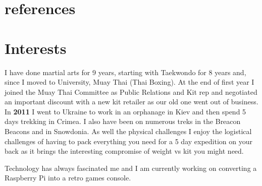 \documentclass[11pt,a4paper,sans]{moderncv} %
\begin{document}

\section{references}

\section{Interests}

{
	I have done martial arts for 9 years, starting with Taekwondo for 8 years and, since I moved to University,  Muay Thai (Thai Boxing). At the end of first year I joined the Muay Thai Committee as Public Relations and Kit rep and negotiated an important discount with a new kit retailer as our old one went out of business. 
}
{
	In \textbf{2011} I went to Ukraine to work in an orphanage in Kiev and then spend 5 days trekking in Crimea. I also have been on numerous treks in the Breacon Beacons and in Snowdonia. As well the physical challenges I enjoy the logistical challenges of having to pack everything you need for a 5 day expedition on your back as it brings the interesting compromise of weight vs kit you might need.
}

{
	Technology has always fascinated me and I am currently working on converting a Raspberry Pi into a retro games console.
}
\end{document}
